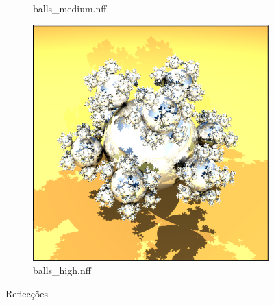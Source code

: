 \documentclass{article}
\begin{document}
\begin{figure}[h!]
\begin{subfigure}{.2\textwidth}
            \caption{balls\_medium.nff}
            \label{fig:balls_medium}
        \end{subfigure}
        \begin{subfigure}{.2\linewidth}
            \centering
            \includegraphics[width=\linewidth]{balls_high.png}
            \caption{balls\_high.nff}
            \label{fig:balls_high}
        \end{subfigure}

        \caption{Reflecções}
        \label{fig:balls}
    \end{figure}
\end{document}
